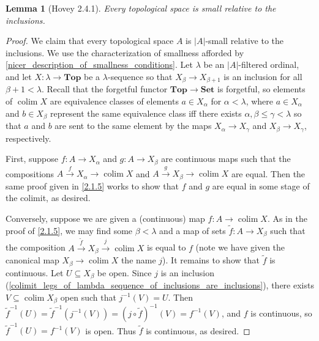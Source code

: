 \documentclass{amsart}
\theoremstyle{plain}
\newtheorem{lemma}[theorem]{Lemma}
\theoremstyle{definition}
\newcommand{\Top}{\mbf{Top}}
\newcommand{\Set}{\mbf{Set}}
\newcommand{\sseq}{\subseteq}
\newcommand{\wt}{\widetilde}
\newcommand{\0}{\mathbf{0}}
\newcommand{\mbf}[1]{\mathbf{#1}}
\renewcommand{\(}{\left(}
\renewcommand{\)}{\right)}
\DeclareMathOperator*{\colim}{colim}
\begin{document}
\begin{lemma}[Hovey 2.4.1]\label{2.4.1}
  Every topological space is small relative to the inclusions.
\end{lemma}
\begin{proof}
  We claim that every topological space $A$ is $|A|$-small relative to the inclusions. We use the characterization of smallness afforded by \autoref{nicer_description_of_smallness_conditions}. Let $\lambda$ be an $|A|$-filtered ordinal, and let $X:\lambda\to\Top$ be a $\lambda$-sequence so that $X_\beta\to X_{\beta+1}$ is an inclusion for all $\beta+1<\lambda$. Recall that the forgetful functor $\Top\to\Set$ is forgetful, so elements of $\colim X$ are equivalence classes of elements $a\in X_\alpha$ for $\alpha<\lambda$, where $a\in X_\alpha$ and $b\in X_\beta$ represent the same equivalence class iff there exists $\alpha,\beta\leq\gamma<\lambda$ so that $a$ and $b$ are sent to the same element by the maps $X_\alpha\to X_\gamma$ and $X_\beta\to X_\gamma$, respectively.

  First, suppose $f:A\to X_\alpha$ and $g:A\to X_\beta$ are continuous maps such that the compositions $A\xrightarrow fX_\alpha\to\colim X$ and $A\xrightarrow gX_\beta\to \colim X$ are equal. Then the same proof given in \autoref{2.1.5} works to show that $f$ and $g$ are equal in some stage of the colimit, as desired.

  Conversely, suppose we are given a (continuous) map $f:A\to\colim X$. As in the proof of \autoref{2.1.5}, we may find some $\beta<\lambda$ and a map of sets $\wt f:A\to X_\beta$ such that the composition $A\xrightarrow{\wt f}X_\beta\xrightarrow j\colim X$ is equal to $f$ (note we have given the canonical map $X_\beta\to\colim X$ the name $j$). It remains to show that $\wt f$ is continuous. Let $U\sseq X_\beta$ be open. Since $j$ is an inclusion (\autoref{colimit_legs_of_lambda_sequence_of_inclusions_are_inclusions}), there exists $V\sseq\colim X_\beta$ open such that $j^{-1}(V)=U$. Then ${\wt f}^{-1}(U)=\wt f^{-1}(j^{-1}(V))=(j\circ\wt f)^{-1}(V)=f^{-1}(V)$, and $f$ is continuous, so $\wt f^{-1}(U)=f^{-1}(V)$ is open. Thus $\wt f$ is continuous, as desired.
\end{proof}
\end{document}
